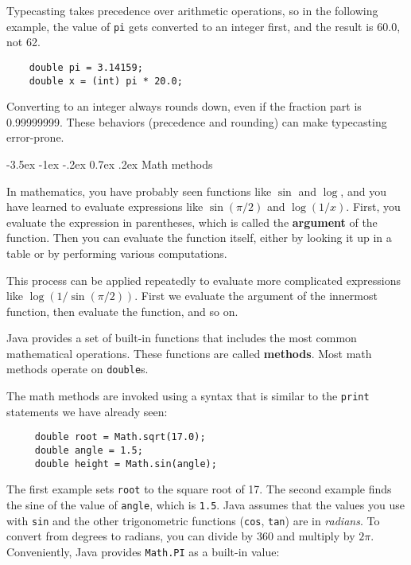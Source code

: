 \documentclass{book}
\makeatletter
\renewcommand{\section}{\@startsection 
    {section} {1} {0mm}%
    {-3.5ex \@plus -1ex \@minus -.2ex}%
    {0.7ex \@plus.2ex}%
    {\normalfont\Large\bfseries}}
\makeatother
\begin{document}
Typecasting takes precedence over arithmetic operations,
so in the following example, the value of {\tt pi} gets
converted to an integer first, and the result
is 60.0, not 62.

\begin{verbatim}
    double pi = 3.14159;
    double x = (int) pi * 20.0;
\end{verbatim}
% 
Converting to an integer always rounds down, even if the fraction
part is 0.99999999.  These behaviors (precedence and rounding)
can make typecasting error-prone.


\section{Math methods}

In mathematics, you have probably seen functions like $\sin$ and
$\log$, and you have learned to evaluate expressions like
$\sin(\pi/2)$ and $\log(1/x)$.  First, you evaluate the
expression in parentheses, which is called the {\bf argument} of the
function.
Then you can evaluate the function itself, either by looking it up in
a table or by performing various computations.

This process can be applied repeatedly to evaluate more complicated
expressions like $\log(1/\sin(\pi/2))$.  First we evaluate the
argument of the innermost function, then evaluate the function,
and so on.

Java provides a set of built-in functions that includes the most
common mathematical operations.  These functions
are called {\bf methods}.  Most math methods operate on
{\tt double}s.

The math methods are invoked using a syntax that is similar to
the {\tt print} statements we have already seen:

\begin{verbatim}
     double root = Math.sqrt(17.0);
     double angle = 1.5;
     double height = Math.sin(angle);
\end{verbatim}
%
The first example sets {\tt root} to the square root of 17.
The second example finds the sine of the value of {\tt angle},
which is {\tt 1.5}.  Java assumes that the
values you use with {\tt sin} and the other trigonometric functions
({\tt cos}, {\tt tan}) are in {\em radians}.  To
convert from degrees to radians, you can divide by 360
and multiply by $2 \pi$.  Conveniently, Java provides {\tt Math.PI}
as a built-in value:
\end{document}
